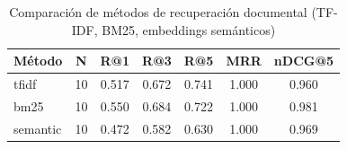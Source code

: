 \begin{table}[htbp]
\centering
\caption{Comparación de métodos de recuperación documental (TF-IDF, BM25, embeddings semánticos)}
\begin{tabular}{lcccccc}
\toprule
Método & N & R@1 & R@3 & R@5 & MRR & nDCG@5 \\
\midrule
tfidf & 10 & 0.517 & 0.672 & 0.741 & 1.000 & 0.960 \\
bm25 & 10 & 0.550 & 0.684 & 0.722 & 1.000 & 0.981 \\
semantic & 10 & 0.472 & 0.582 & 0.630 & 1.000 & 0.969 \\
\bottomrule
\end{tabular}

\label{tab:rag-retrieval-comparison}
\end{table}
